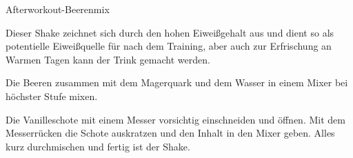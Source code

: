 \begin{recipe}[]{ Afterworkout-Beerenmix }{}{}

Dieser Shake zeichnet sich durch den hohen Eiweißgehalt aus und dient so als potentielle Eiweißquelle für nach dem Training, aber auch zur Erfrischung an Warmen Tagen kann der Trink gemacht werden.



\step
Die Beeren zusammen mit dem Magerquark und dem Wasser in einem Mixer bei höchster Stufe \min mixen.

\step
Die Vanilleschote mit einem Messer vorsichtig einschneiden und öffnen. Mit dem Messerrücken die Schote auskratzen und den Inhalt in den Mixer geben. Alles kurz durchmischen und fertig ist der Shake.


\end{recipe}